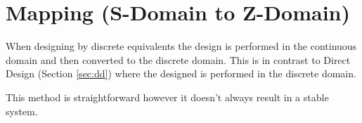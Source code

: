 \documentclass{article}
\newcommand{\sincludepdf}[2][]{
	
}
\begin{document}
\sincludepdf[pages={1},
			pagecommand=\subsection*{Example 3}
		]{scan/11221301.pdf}
\sincludepdf[pages={2}]{scan/11221301.pdf}

\sincludepdf[pages={1},
			pagecommand=\subsection*{Example 4}
		]{scan/11241301.pdf}
\sincludepdf[pages={2}]{scan/11241301.pdf}

\sincludepdf[pages={1},
			pagecommand=\subsection*{Example 5}
		]{scan/11251301.pdf}
\sincludepdf[pages={2}]{scan/11251301.pdf}


\section{Mapping (S-Domain to Z-Domain)}
\label{sec:mapping}

When designing by discrete equivalents the design is performed
in the continuous domain and then converted to the discrete domain.
This is in contrast to Direct Design (Section \ref{sec:dd}) where
the designed is performed in the discrete domain.

This method is straightforward however it doesn't always result in
a stable system.

\sincludepdf[pages={10},
		pagecommand=\subsection{Mapping: $z=e^{sT}$}\label{sec:mapzest}\subsubsection*{Example 1}
		]{scan/11221301.pdf}

\sincludepdf[pages={1},
			pagecommand=\subsubsection*{Example 2}
	]{scan/11231301.pdf}

\sincludepdf[pages={9},
			pagecommand=\subsection{Mapping: Forward, Backward, Trapezoid}\subsubsection*{Example 1}
	]{scan/11211301.pdf}
\end{document}

